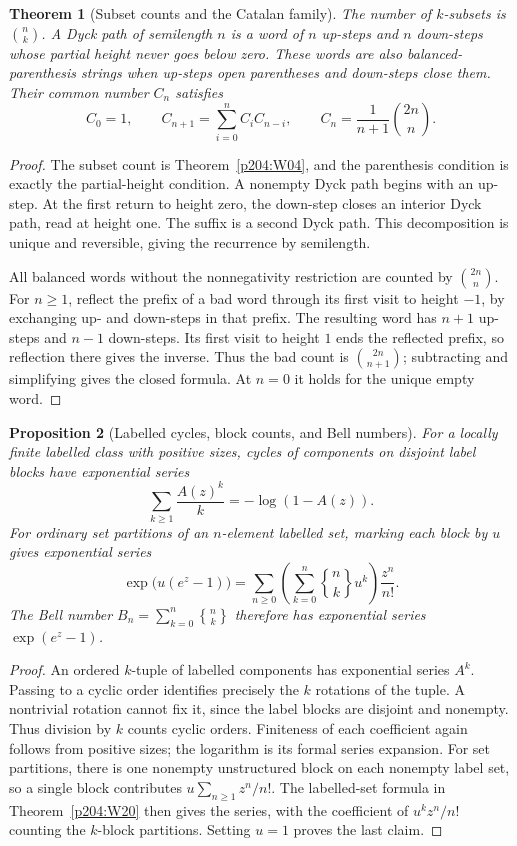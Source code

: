 \documentclass[11pt,oneside,openany]{book}
\newcommand{\bracebinom}[2]{\genfrac{\{}{\}}{0pt}{}{#1}{#2}}
\theoremstyle{plain}
\newtheorem{theorem}{Theorem}[chapter]
\newtheorem{proposition}[theorem]{Proposition}
\theoremstyle{definition}
\theoremstyle{remark}
\begin{document}
\begin{theorem}[Subset counts and the Catalan family]\label{p204:W21}
The number of \(k\)-subsets is \(\binom nk\). A Dyck path of
semilength \(n\) is a word of \(n\) up-steps and \(n\) down-steps
whose partial height never goes below zero. These words are also
balanced-parenthesis strings when up-steps open parentheses and
down-steps close them. Their common
number \(C_n\) satisfies
\[
 C_0=1,\qquad
 C_{n+1}=\sum_{i=0}^n C_i C_{n-i},\qquad
 C_n=\frac{1}{n+1}\binom{2n}{n}.
\]
\end{theorem}
\begin{proof}
The subset count is Theorem~\ref{p204:W04}, and the
parenthesis condition is exactly the partial-height condition.
A nonempty Dyck path begins with an up-step. At the first
return to height zero, the down-step closes an interior
Dyck path, read at height one. The suffix is a second Dyck path.
This decomposition is unique and reversible, giving the
recurrence by semilength.

All balanced words without the nonnegativity restriction are
counted by \(\binom{2n}{n}\). For \(n\ge1\), reflect the prefix of
a bad word through its first visit to height \(-1\), by exchanging
up- and down-steps in that prefix. The resulting word has \(n+1\)
up-steps and \(n-1\) down-steps. Its first visit to height \(1\)
ends the reflected prefix, so reflection there gives the inverse.
Thus the bad count is \(\binom{2n}{n+1}\); subtracting and
simplifying gives the closed formula. At \(n=0\) it holds for
the unique empty word.
\end{proof}

\begin{proposition}[Labelled cycles, block counts, and Bell numbers]
\label{p204:W22}
For a locally finite labelled class with positive sizes, cycles
of components on disjoint label blocks have exponential series
\[
 \sum_{k\ge1}\frac{A(z)^k}{k}=-\log(1-A(z)).
\]
For ordinary set partitions of an \(n\)-element labelled set,
marking each block by \(u\) gives exponential series
\[
 \exp\bigl(u(e^z-1)\bigr)
 =\sum_{n\ge0}\left(\sum_{k=0}^n \bracebinom{n}{k}u^k\right)\frac{z^n}{n!}.
\]
The Bell number \(B_n=\sum_{k=0}^n\bracebinom{n}{k}\) therefore has
exponential series \(\exp(e^z-1)\).
\end{proposition}
\begin{proof}
An ordered \(k\)-tuple of labelled components has exponential
series \(A^k\). Passing to a cyclic order identifies precisely
the \(k\) rotations of the tuple. A nontrivial rotation cannot
fix it, since the label blocks are disjoint and nonempty.
Thus division by \(k\) counts cyclic orders. Finiteness of each
coefficient again follows from positive sizes; the logarithm
is its formal series expansion. For set partitions, there is
one nonempty unstructured block on each nonempty label set,
so a single block contributes \(u\sum_{n\ge1}z^n/n!\).
The labelled-set formula in Theorem~\ref{p204:W20} then
gives the series, with the coefficient of \(u^kz^n/n!\)
counting the \(k\)-block partitions. Setting \(u=1\) proves
the last claim.
\end{proof}
\end{document}
